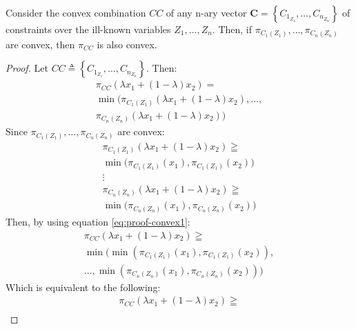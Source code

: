 \begin{theorem}
\label{th:convex-combination-ill-known-constraints}
Consider the convex combination $CC$ of any n-ary vector $\mathbf{C} = \left \lbrace C_{1_{Z_1}}, \ldots, C_{n_{Z_n}} \right \rbrace$ of constraints over the ill-known variables $Z_1, \ldots, Z_n$. Then, if $\pi_{C_1(Z_1)}, \ldots, \pi_{C_n(Z_n)}$ are convex, then  $\pi_{CC}$ is also convex.
\end{theorem}

\begin{proof}
Let $CC \triangleq \left \lbrace C_{1_{Z_1}}, \ldots, C_{n_{Z_n}}  \right \rbrace$. Then:
\begin{align}
\label{eq:proof-convex1}
\pi_{CC} \left( \lambda x_1 + \left( 1 - \lambda \right)x_2 \right) = \\
\min  \big( \pi_{C_1(Z_1)}\left( \lambda x_1 + \left( 1 - \lambda \right)x_2 \right), \ldots,\\
   \pi_{C_n(Z_n)}\left( \lambda x_1 + \left( 1 - \lambda \right)x_2 \right)  \big)
\end{align}
Since $\pi_{C_1(Z_1)}, \ldots, \pi_{C_n(Z_n)}$ are convex:
\begin{align}
\label{eq:proof-convex2}
\pi_{C_1(Z_1)} \left(\lambda x_1 + \left( 1 - \lambda \right)x_2  \right) \geqq \\
\nonumber
\min \big(\pi_{C_1(Z_1)} \left( x_1 \right),\pi_{C_1(Z_1)} \left( x_2 \right)  \big)\\
\nonumber
\vdots \\
\nonumber
\pi_{C_n(Z_n)} \left(\lambda x_1 + \left( 1 - \lambda \right)x_2  \right) \geqq \\
\nonumber
\min \big(\pi_{C_n(Z_n)} \left( x_1 \right),\pi_{C_n(Z_n)} \left( x_2 \right) \big) 
\end{align}
Then, by using equation \eqref{eq:proof-convex1}:
\begin{align}
\label{eq:proof-convex3}
\pi_{CC} \left( \lambda x_1 + \left( 1 - \lambda \right)x_2 \right) \geqq  \\
\nonumber
\min \big( \min \left(\pi_{C_1(Z_1)} \left( x_1 \right),\pi_{C_1(Z_1)} \left( x_2 \right) \right),\\
\nonumber
\ldots, \min \left(\pi_{C_n(Z_n)} \left( x_1 \right),\pi_{C_n(Z_n)} \left( x_2 \right) \right) \big)
\end{align}
Which is equivalent to the following:
\begin{align}
\label{eq:proof-convex4}
\pi_{CC} \left( \lambda x_1 + \left( 1 - \lambda \right)x_2 \right) \geqq  \\

\end{align}
\end{proof}
